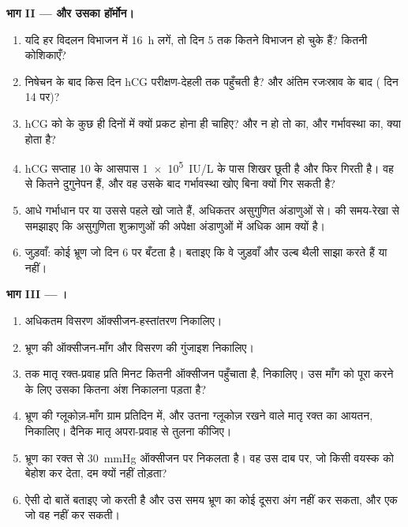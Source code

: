 \begin{problem}
\medskip
\noindent\textbf{भाग II ---  और उसका हॉर्मोन।}
\begin{enumerate}[resume]
  \item यदि हर विदलन विभाजन में \qty{16}{h} लगें, तो दिन 5 तक कितने
        विभाजन हो चुके हैं? कितनी कोशिकाएँ?
  \item निषेचन के बाद किस दिन hCG परीक्षण-देहली तक पहुँचती है? और
        अंतिम रजःस्राव के बाद ( दिन 14 पर)?
  \item hCG को  के कुछ ही दिनों में क्यों प्रकट होना ही चाहिए? और
        न हो तो  का, और गर्भावस्था का, क्या
        होता है?
  \item hCG सप्ताह 10 के आसपास \qty{1e5}{IU/L} के पास शिखर छूती है और
        फिर गिरती है। वह  से कितने दुगुनेपन हैं, और वह
        उसके बाद गर्भावस्था खोए बिना क्यों गिर सकती है?
  \item आधे गर्भाधान  पर या उससे पहले खो जाते हैं,
        अधिकतर असुगुणित अंडाणुओं से।  की समय-रेखा
        से समझाइए कि असुगुणिता शुक्राणुओं की अपेक्षा अंडाणुओं में अधिक
        आम क्यों है।
  \item जुड़वाँ: कोई भ्रूण जो दिन 6 पर बँटता है। बताइए कि वे जुड़वाँ
         और उल्ब थैली साझा करते हैं या नहीं।
\end{enumerate}

\medskip
\noindent\textbf{भाग III --- ।}
\begin{enumerate}[resume]
  \item अधिकतम विसरण ऑक्सीजन-हस्तांतरण निकालिए।
  \item भ्रूण की ऑक्सीजन-माँग और विसरण की गुंजाइश निकालिए।
  \item {} तक मातृ रक्त-प्रवाह प्रति मिनट कितनी ऑक्सीजन
        पहुँचाता है, निकालिए। उस माँग को पूरा करने के लिए उसका कितना अंश
        निकालना पड़ता है?
  \item भ्रूण की ग्लूकोज़-माँग ग्राम प्रतिदिन में, और उतना ग्लूकोज़
        रखने वाले मातृ रक्त का आयतन, निकालिए। दैनिक मातृ अपरा-प्रवाह से
        तुलना कीजिए।
  \item भ्रूण का रक्त  से \qty{30}{mmHg} ऑक्सीजन पर
        निकलता है। वह उस दाब पर, जो किसी वयस्क को बेहोश कर देता, दम क्यों
        नहीं तोड़ता?
  \item ऐसी दो बातें बताइए जो  करती है और उस समय भ्रूण का
        कोई दूसरा अंग नहीं कर सकता, और एक जो वह नहीं कर सकती।
\end{enumerate}


\end{problem}
